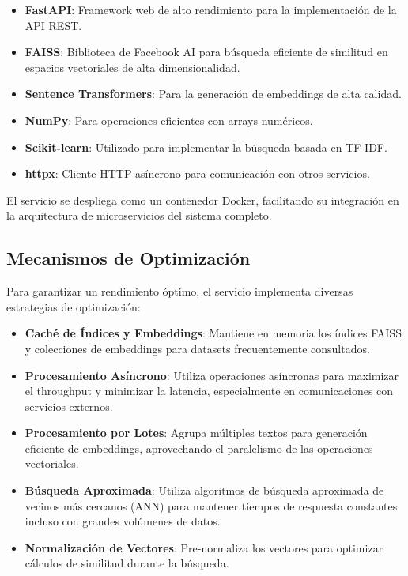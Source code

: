 \documentclass[12pt,a4paper]{article}
\begin{document}
\begin{itemize}
    \item \textbf{FastAPI}: Framework web de alto rendimiento para la implementación de la API REST.
    
    \item \textbf{FAISS}: Biblioteca de Facebook AI para búsqueda eficiente de similitud en espacios vectoriales de alta dimensionalidad.
    
    \item \textbf{Sentence Transformers}: Para la generación de embeddings de alta calidad.
    
    \item \textbf{NumPy}: Para operaciones eficientes con arrays numéricos.
    
    \item \textbf{Scikit-learn}: Utilizado para implementar la búsqueda basada en TF-IDF.
    
    \item \textbf{httpx}: Cliente HTTP asíncrono para comunicación con otros servicios.
\end{itemize}

El servicio se despliega como un contenedor Docker, facilitando su integración en la arquitectura de microservicios del sistema completo.

\subsection{Mecanismos de Optimización}
\label{subsec:ss-optimizacion}

Para garantizar un rendimiento óptimo, el servicio implementa diversas estrategias de optimización:

\begin{itemize}
    \item \textbf{Caché de Índices y Embeddings}: Mantiene en memoria los índices FAISS y colecciones de embeddings para datasets frecuentemente consultados.
    
    \item \textbf{Procesamiento Asíncrono}: Utiliza operaciones asíncronas para maximizar el throughput y minimizar la latencia, especialmente en comunicaciones con servicios externos.
    
    \item \textbf{Procesamiento por Lotes}: Agrupa múltiples textos para generación eficiente de embeddings, aprovechando el paralelismo de las operaciones vectoriales.
    
    \item \textbf{Búsqueda Aproximada}: Utiliza algoritmos de búsqueda aproximada de vecinos más cercanos (ANN) para mantener tiempos de respuesta constantes incluso con grandes volúmenes de datos.
    
    \item \textbf{Normalización de Vectores}: Pre-normaliza los vectores para optimizar cálculos de similitud durante la búsqueda.
\end{itemize}
\end{document}
